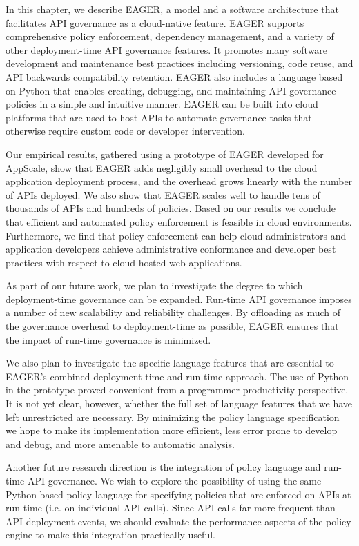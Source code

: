 In this chapter, we describe EAGER, a model and a software architecture that 
facilitates API governance as a cloud-native feature. EAGER supports comprehensive policy
enforcement, dependency management, and a variety of other deployment-time API
governance features. It promotes many software development and maintenance
best practices including versioning, code reuse, and API backwards
compatibility retention. EAGER also includes a language based on Python that enables
creating, debugging, and maintaining API governance policies in a simple and intuitive
manner. EAGER can be built into cloud platforms that are used to host APIs
to automate governance tasks that otherwise require custom code or developer intervention.

Our empirical results, gathered using a prototype of EAGER developed for AppScale,
show that EAGER adds negligibly small overhead to the cloud application 
deployment process, and the overhead grows linearly
with the number of APIs deployed. We also show that EAGER scales well 
to handle tens of thousands of APIs and hundreds of policies. Based on our
results we conclude that efficient and automated policy enforcement is feasible
in cloud environments. Furthermore, we find that policy enforcement can help
cloud administrators and application developers achieve administrative 
conformance and developer best practices with respect to cloud-hosted 
web applications.


As part of our future work, we plan to investigate the degree to which
deployment-time governance can be expanded.
Run-time API governance imposes a number of new scalability and
reliability challenges.  By offloading as much of the governance overhead to
deployment-time as possible, EAGER ensures that the impact of run-time
governance is minimized.  

We also plan to investigate the specific language features that are essential
to EAGER's combined deployment-time and run-time approach.  The use of Python
in the prototype proved convenient from a programmer productivity perspective.
It is not yet clear, however, whether the full set of language features that
we have left unrestricted are necessary.  By minimizing the policy language
specification we hope to make its implementation more efficient, less
error prone to develop and debug, and more amenable to automatic analysis.

Another future research direction is the integration of policy language and
run-time API governance.
We wish to explore the possibility of using the same Python-based
policy language for
specifying policies that are enforced on APIs at run-time (i.e. on individual
API calls). Since API calls
far more frequent than API deployment events, we should evaluate
the performance aspects of the policy engine to make this integration practically useful.
